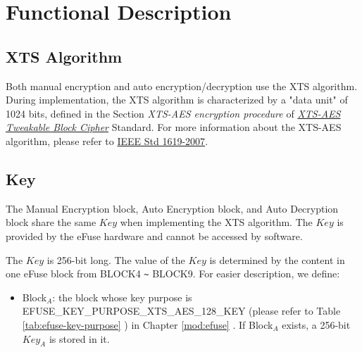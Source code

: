 \documentclass[main\_\_EN.tex]{subfiles}
\begin{document}
\section{Functional Description}

\subsection{XTS Algorithm}
\label{sec:extmemncr-xts-algo}

Both manual encryption and auto encryption/decryption use the XTS algorithm. During implementation, the XTS algorithm is characterized by a "data unit" of 1024 bits, defined in the Section \textit{XTS-AES encryption procedure} of  \href{https://ieeexplore.ieee.org/document/4493450}{\textit{XTS-AES Tweakable Block Cipher}} Standard. For more information about the XTS-AES algorithm, please refer to \href{https://ieeexplore.ieee.org/document/4493450}{IEEE Std 1619-2007}.

\subsection{Key}
\label{sec:extmemncr-key}
The Manual Encryption block, Auto Encryption block, and Auto Decryption block share the same \begin{math}\mathit{Key}\end{math} when implementing the XTS algorithm. The \begin{math}\mathit{Key}\end{math} is provided by the eFuse hardware and cannot be accessed by software.

The \begin{math}\mathit{Key}\end{math} is 256-bit long. The value of the \begin{math}\mathit{Key}\end{math} is determined by the content in one eFuse block from BLOCK4 \verb+~+ BLOCK9. For easier description, we define:
\begin{itemize}
\item Block$_A$: the block whose key purpose is EFUSE\_KEY\_PURPOSE\_XTS\_AES\_128\_KEY (please refer to Table \ref{tab:efuse-key-purpose} \textit{}) in Chapter \ref{mod:efuse} \textit{}. If Block$_A$ exists, a 256-bit \begin{math}\mathit{Key}_{A}\end{math} is stored in it.
\end{itemize}
\end{document}
